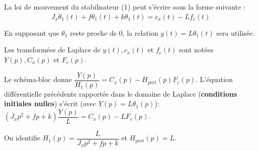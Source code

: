 %
%
%
%


\ifprof
\else
La loi de mouvement du stabilisateur (1) peut s'écrire sous la forme suivante :
$$
J_{x} \ddot{\theta}_{1}(t)+f \dot{\theta}_{1}(t)+k \theta_{1}(t)=c_{x}(t)-L f_{c}(t)
$$

En supposant que $\theta_{1}$ reste proche de 0, la relation $y(t)=L \theta_{1}(t)$ sera utilisée.

Les transformées de Laplace de $y(t), c_{x}(t)$ et $f_{c}(t)$ sont notées $Y(p), C_{x}(p)$ et $F_{c}(p)$.
\fi

\ifprof
\begin{corrige}
Le schéma-bloc donne $\dfrac{Y(p)}{H_1(p)} = C_x(p) - H_{\text{pert}}(p)F_c(p)$. L'équation différentielle précédente rapportée dans le domaine de Laplace (\textbf{conditions initiales nulles}) s'écrit (avec $Y(p) = L \theta_1(p)$):
$ \left( J_x p^2 + f p + k \right)\dfrac{Y(p)}{L} = C_x(p) - L F_c(p) $.

On identifie $\boxed{H_1(p) = \dfrac{L}{J_x p^2 + f p + k}}$ et $\boxed{H_{\text{pert}}(p) = L}$.
\end{corrige}
\else
\fi

